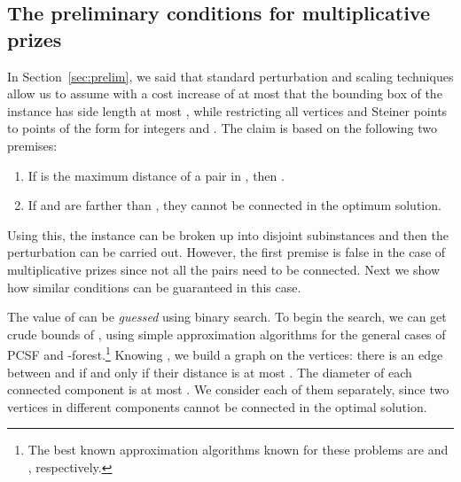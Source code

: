 \documentclass[extras,11pt]{article} \usepackage{fullpage}
\theoremstyle{mytheorem}
\newenvironment{proofof}[1]{\par\noindent{\bf #1.}\hspace{0.5em}}
    {\hfill\qed\vspace{1ex}}
\begin{document}
\iffalse
\begin{proofof}{\proofname\ of Lemma~\ref{lem:round-err}}
 We recompute the penalties paid by 
 using the rounded weights.
 The pair  not connected in   is either of the two kinds:
 (1) one of  and  is in ; or (2) none of them is in .
 The total rounding error for the penalties of the first type is bounded by
 .
 There are at most  pairs of the second type.
  Since the weights of these terminals are at most ,
 the error is not more than .
 Hence, the total error is at most

which is no more than  as desired.
\end{proofof}
\fi



\subsection{The preliminary conditions for multiplicative prizes}\label{sec:prelim-mult}
In Section~\ref{sec:prelim}, we said that standard perturbation and scaling techniques allow us to assume
with a cost increase of at most 
that the bounding box of the instance has side length at most ,
while restricting all vertices and Steiner points to points of the form  for integers  and .
The claim is based on the following two premises:
\begin{enumerate}\setlength{\itemsep}{-.01in}
\item If  is the maximum distance of a pair in , then .
\item If  and 
are farther than ,
they cannot be connected in the optimum solution.
\end{enumerate}
Using this, the instance can be broken up into disjoint subinstances and then the perturbation can be carried out.
However, the first premise is false in the case of multiplicative prizes since not all the pairs need to be connected.
Next we show how similar conditions can be guaranteed in this case.

The value of  can be \emph{guessed} using binary search.
To begin the search, we can get crude bounds of ,
using simple approximation algorithms for the general cases of PCSF and -forest.\footnote{The best known approximation algorithms known for these problems are  and , respectively.}
Knowing , we build a graph  on the vertices:
there is an edge between  and  if and only if their distance is at most .
The diameter of each connected component is at most .
We consider each of them separately, since two vertices in different components cannot be connected in the optimal solution.
\end{document}
